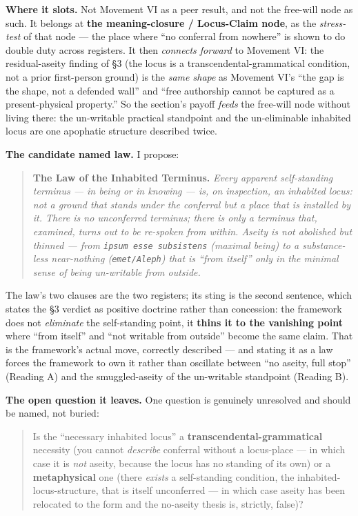 \documentclass[11pt]{article}
\begin{document}
\textbf{Where it slots.} Not Movement VI as a peer result, and not the free-will node as such. It belongs at \textbf{the meaning-closure /\allowbreak{} Locus-Claim node}, as the \emph{stress-test} of that node — the place where ``no conferral from nowhere'' is shown to do double duty across registers. It then \emph{connects forward} to Movement VI: the residual-aseity finding of §3 (the locus is a transcendental-grammatical condition, not a prior first-person ground) is the \emph{same shape} as Movement VI's ``the gap is the shape, not a defended wall'' and ``free authorship cannot be captured as a present-physical property.'' So the section's payoff \emph{feeds} the free-will node without living there: the un-writable practical standpoint and the un-eliminable inhabited locus are one apophatic structure described twice.

\textbf{The candidate named law.} I propose:

\begin{quote}
\textbf{The Law of the Inhabited Terminus.} \emph{Every apparent self-standing terminus — in being or in knowing — is, on inspection, an inhabited locus: not a ground that stands under the conferral but a place that is installed by it. There is no unconferred terminus; there is only a terminus that, examined, turns out to be re-spoken from within. Aseity is not abolished but thinned — from \texttt{ipsum esse subsistens} (maximal being) to a substance-less near-nothing (\texttt{emet/Aleph}) that is ``from itself'' only in the minimal sense of being un-writable from outside.}
\end{quote}

The law's two clauses are the two registers; its sting is the second sentence, which states the §3 verdict as positive doctrine rather than concession: the framework does not \emph{eliminate} the self-standing point, it \textbf{thins it to the vanishing point} where ``from itself'' and ``not writable from outside'' become the same claim. That is the framework's actual move, correctly described — and stating it as a law forces the framework to own it rather than oscillate between ``no aseity, full stop'' (Reading A) and the smuggled-aseity of the un-writable standpoint (Reading B).

\textbf{The open question it leaves.} One question is genuinely unresolved and should be named, not buried:

\begin{quote}
Is the ``necessary inhabited locus'' a \textbf{transcendental-grammatical} necessity (you cannot \emph{describe} conferral without a locus-place — in which case it is \emph{not} aseity, because the locus has no standing of its own) or a \textbf{metaphysical} one (there \emph{exists} a self-standing condition, the inhabited-locus-structure, that is itself unconferred — in which case aseity has been relocated to the form and the no-aseity thesis is, strictly, false)?
\end{quote}
\end{document}

